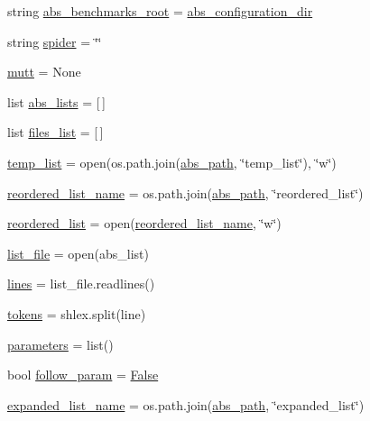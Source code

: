 \begin{DoxyCompactItemize}
\item 
string \hyperlink{namespacetest__panda_a420b78aa50adb0ce19e2fe6e434faa66}{abs\+\_\+benchmarks\+\_\+root} = \hyperlink{namespacetest__panda_ae81c2fb49691eabd091c55b5c5fdba1c}{abs\+\_\+configuration\+\_\+dir}
\item 
string \hyperlink{namespacetest__panda_a925c8594b63c7578c449ad91c8a63f34}{spider} = \char`\"{}\char`\"{}
\item 
\hyperlink{namespacetest__panda_a50a12673670ef760b925f1685e7dab23}{mutt} = None
\item 
list \hyperlink{namespacetest__panda_a5d4a47813f8791042aa7f9d7a299a813}{abs\+\_\+lists} = \mbox{[}$\,$\mbox{]}
\item 
list \hyperlink{namespacetest__panda_a11a46c02568d040641ee8a443cc54523}{files\+\_\+list} = \mbox{[}$\,$\mbox{]}
\item 
\hyperlink{namespacetest__panda_ac11fc08b9c4f7bf3f1d47d8ba9399feb}{temp\+\_\+list} = open(os.\+path.\+join(\hyperlink{namespacetest__panda_a78bb23566d04ac65a03195681449d2c0}{abs\+\_\+path}, \char`\"{}temp\+\_\+list\char`\"{}), \char`\"{}w\char`\"{})
\item 
\hyperlink{namespacetest__panda_a171d0c5a01b314cd3babab2cfbf170d2}{reordered\+\_\+list\+\_\+name} = os.\+path.\+join(\hyperlink{namespacetest__panda_a78bb23566d04ac65a03195681449d2c0}{abs\+\_\+path}, \char`\"{}reordered\+\_\+list\char`\"{})
\item 
\hyperlink{namespacetest__panda_a22156bbf1a169c8e689ef6cdb5b7b7c7}{reordered\+\_\+list} = open(\hyperlink{namespacetest__panda_a171d0c5a01b314cd3babab2cfbf170d2}{reordered\+\_\+list\+\_\+name}, \char`\"{}w\char`\"{})
\item 
\hyperlink{namespacetest__panda_a54f6778c9b00e0e5756d9b0b168c097d}{list\+\_\+file} = open(abs\+\_\+list)
\item 
\hyperlink{namespacetest__panda_aed9d3d7e1d5c10f7a7969e57e511dd95}{lines} = list\+\_\+file.\+readlines()
\item 
\hyperlink{namespacetest__panda_a2d26dd74cc87c155c90e49e45383a469}{tokens} = shlex.\+split(line)
\item 
\hyperlink{namespacetest__panda_ab9df5b55d8be6db30f3b8e8cbf2eb6c4}{parameters} = list()
\item 
bool \hyperlink{namespacetest__panda_a03e7214bb0aee93ed5a755f3e6043c2e}{follow\+\_\+param} = \hyperlink{namespacetest__panda_af93daddc6b1a54e0ad3c68aa4c89eb92}{False}
\item 
\hyperlink{namespacetest__panda_ad1931f0d30dc5508b22ea73a25760392}{expanded\+\_\+list\+\_\+name} = os.\+path.\+join(\hyperlink{namespacetest__panda_a78bb23566d04ac65a03195681449d2c0}{abs\+\_\+path}, \char`\"{}expanded\+\_\+list\char`\"{})

\end{DoxyCompactItemize}
